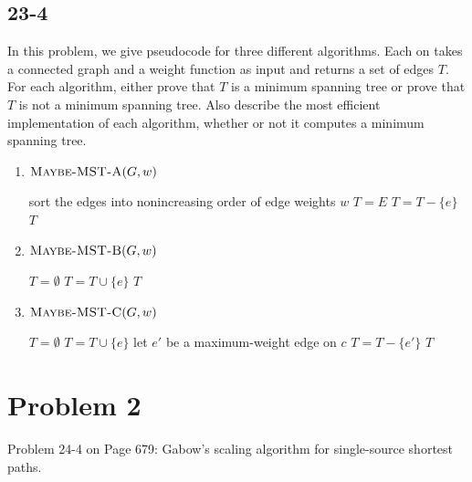 \documentclass{../../class}
\begin{document}
\subsection*{23-4}
In this problem, we give pseudocode for three different algorithms. Each on takes a connected graph and a weight function as input and returns a set of edges $T$. For each algorithm, either prove that $T$ is a minimum spanning tree or prove that $T$ is not a minimum spanning tree. Also describe the most efficient implementation of each algorithm, whether or not it computes a minimum spanning tree.
\begin{enumerate}
    \item $\textsc{Maybe-MST-A}(G, w)$
    \begin{algorithmic}[1]
        \State sort the edges into nonincreasing order of edge weights $w$
        \State $T = E$
                \State $T = T - \{e\}$
            \EndIf
        \EndFor\vspace{-0.3em}
        \State \Return $T$
    \end{algorithmic}
    \item $\textsc{Maybe-MST-B}(G, w)$
    \begin{algorithmic}[1]
        \State $T = \emptyset$
                \State $T = T\cup \{e\}$
            \EndIf
        \EndFor\vspace{-0.3em}
        \State \Return $T$
    \end{algorithmic}
    \item $\textsc{Maybe-MST-C}(G, w)$
    \begin{algorithmic}[1]
        \State $T = \emptyset$
            \State $T = T\cup \{e\}$
                \State let $e'$ be a maximum-weight edge on $c$
                \State $T = T - \{e'\}$
            \EndIf
        \EndFor\vspace{-0.3em}
        \State \Return $T$
    \end{algorithmic}
\end{enumerate}

\newpage
\section*{Problem 2}
\begin{tcolorbox}
    Problem 24-4 on Page 679: Gabow's scaling algorithm for single-source shortest paths.
\end{tcolorbox}
\end{document}
